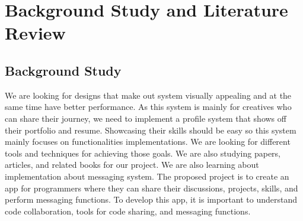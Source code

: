 \chapter{Background Study and Literature Review}





\section{Background Study}

We are looking for designs that make out system visually appealing and at the same time have better performance. As this system is mainly for creatives who can share their journey, we need to implement a profile system that shows off their portfolio and resume. Showcasing their skills should be easy so this system mainly focuses on functionalities implementations. We are looking for different tools and techniques for achieving those goals. We are also studying papers, articles, and related books for our project. We are also learning about implementation about messaging system.
The proposed project is to create an app for programmers where they can share their discussions, projects, skills, and perform messaging functions. To develop this app, it is important to understand code collaboration, tools for code sharing, and messaging functions.


